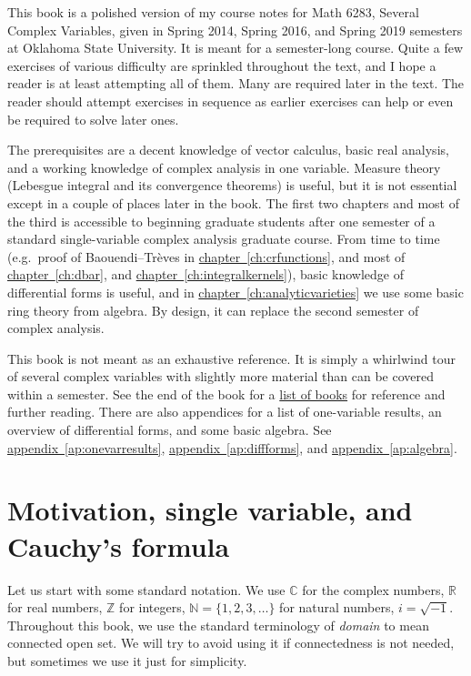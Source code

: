 \documentclass[12pt,openany]{book}
\newcommand{\C}{{\mathbb{C}}}
\newcommand{\R}{{\mathbb{R}}}
\newcommand{\Z}{{\mathbb{Z}}}
\newcommand{\N}{{\mathbb{N}}}
\newcommand{\myindex}[1]{#1\index{#1}}
\theoremstyle{plain}
\theoremstyle{remark}
\theoremstyle{definition}
\theoremstyle{exercise}
\theoremstyle{example}
\newcommand{\chapterref}[1]{\hyperref[#1]{chapter~\ref*{#1}}}
\newcommand{\appendixref}[1]{\hyperref[#1]{appendix~\ref*{#1}}}
\begin{document}

This book is a polished version of my course notes for Math 6283, Several
Complex Variables, given in
Spring 2014, Spring 2016, and Spring 2019 semesters
at Oklahoma State University.
It is meant for a semester-long course.
Quite a few
exercises of various difficulty are
sprinkled throughout the text, and I hope a reader is
at least attempting all of them.  Many are required later in the
text.  The reader should attempt exercises in sequence as earlier exercises
can help or even be required to solve later ones.

The prerequisites are a decent knowledge of vector calculus, basic
real analysis, and a working knowledge of complex analysis in one variable.
Measure theory (Lebesgue integral and its convergence theorems) is useful,
but it is not essential except in a couple of places later in the book.
The first two chapters and most of the third
is accessible to beginning graduate students after one semester
of a standard single-variable complex
analysis graduate course.
From time to time (e.g.\ proof of Baouendi--Tr\`eves in
\chapterref{ch:crfunctions},
and most of
\chapterref{ch:dbar}, and \chapterref{ch:integralkernels}),
basic knowledge of differential forms is useful, and
in \chapterref{ch:analyticvarieties}
we use some basic ring theory from algebra.
By design, it can replace the second semester of complex analysis.

This book is not meant as an exhaustive reference.  It is simply a whirlwind
tour of several complex variables with slightly more material than can
be covered within a semester.  See the end of the book
for a \hyperref[ch:furtherreading]{list of books} for
reference and further reading.  There are also appendices for
a list of one-variable results, an overview of differential forms,
and some basic algebra.
See \appendixref{ap:onevarresults},
\appendixref{ap:diffforms}, and
\appendixref{ap:algebra}.


\section{Motivation, single variable, and Cauchy's formula} \label{sec:motivation}


Let us start with some standard notation.
We use $\C$ for the complex numbers, $\R$
for real numbers,
$\Z$ for integers,
$\N = \{ 1,2,3,\ldots \}$ for natural
numbers,
$i = \sqrt{-1}$.  Throughout this book, we use
the standard terminology of \emph{\myindex{domain}} to mean connected open
set.  We will try to avoid using it if connectedness is not needed, but
sometimes we use it just for simplicity.
\end{document}
